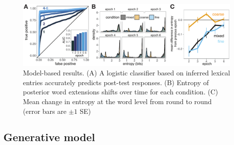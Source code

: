 \documentclass[10pt,letterpaper]{article}
\newcommand{\ndg}[1]{\textcolor{Green}{[ndg: #1]}}
\begin{document}
\begin{figure}[t]
\begin{center}
\includegraphics[scale=0.75]{modelFig.pdf}
{\caption{{Model-based results. (A) A logistic classifier based on inferred lexical entries accurately predicts post-test responses. (B) Entropy of  posterior word extensions shifts over time for each condition. (C) Mean change in entropy at the word level from round to round (error bars are $\pm 1$ SE)}  \label{fig:postTestPrediction}}}
\end{center}
\vspace{-3ex}
\end{figure}

\subsection{Generative model}
\end{document}
